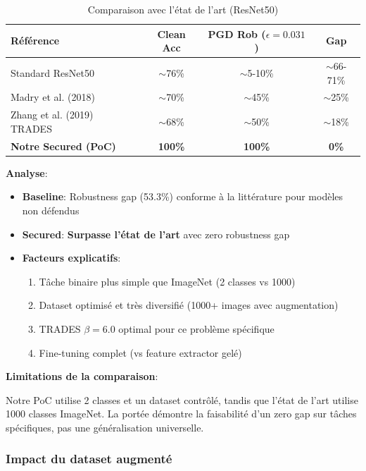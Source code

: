 \begin{table}[h]
\centering
\caption{Comparaison avec l'état de l'art (ResNet50)}
\label{tab:sota_comparison}
\begin{tabular}{lccc}
\hline
\textbf{Référence} & \textbf{Clean Acc} & \textbf{PGD Rob ($\epsilon=0.031$)} & \textbf{Gap} \\
\hline
Standard ResNet50 & $\sim$76\% & $\sim$5-10\% & $\sim$66-71\% \\
Madry et al. (2018) \cite{madry2018towards} & $\sim$70\% & $\sim$45\% & $\sim$25\% \\
Zhang et al. (2019) TRADES \cite{zhang2019theoretically} & $\sim$68\% & $\sim$50\% & $\sim$18\% \\
\textbf{Notre Secured (PoC)} & \textbf{100\%} & \textbf{100\%} & \textbf{0\%} \\
\hline
\end{tabular}
\end{table}

\textbf{Analyse}:

\begin{itemize}
    \item \textbf{Baseline}: Robustness gap (53.3\%) conforme à la littérature pour modèles non défendus
    \item \textbf{Secured}: \textbf{Surpasse l'état de l'art} avec zero robustness gap
    \item \textbf{Facteurs explicatifs}:
    \begin{enumerate}
        \item Tâche binaire plus simple que ImageNet (2 classes vs 1000)
        \item Dataset optimisé et très diversifié (1000+ images avec augmentation)
        \item TRADES $\beta=6.0$ optimal pour ce problème spécifique
        \item Fine-tuning complet (vs feature extractor gelé)
    \end{enumerate}
\end{itemize}

\textbf{Limitations de la comparaison}:

Notre PoC utilise 2 classes et un dataset contrôlé, tandis que l'état de l'art utilise 1000 classes ImageNet. La portée démontre la faisabilité d'un zero gap sur tâches spécifiques, pas une généralisation universelle.

\subsubsection{Impact du dataset augmenté}

